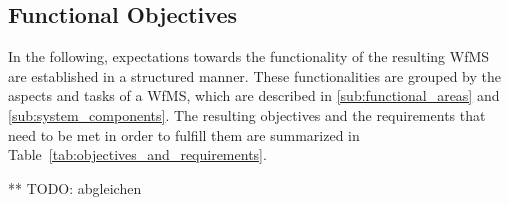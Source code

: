 
\subsection{Functional Objectives} %
  \label{sub:functional_objectives}

  In the following, expectations towards the functionality of the resulting \ac{WfMS} are established in a structured manner. These functionalities are grouped by the aspects and tasks of a \ac{WfMS}, which are described in \ref{sub:functional_areas} and \ref{sub:system_components}. The resulting objectives and the requirements that need to be met in order to fulfill them are summarized in Table~\ref{tab:objectives_and_requirements}.

  ** TODO: abgleichen

